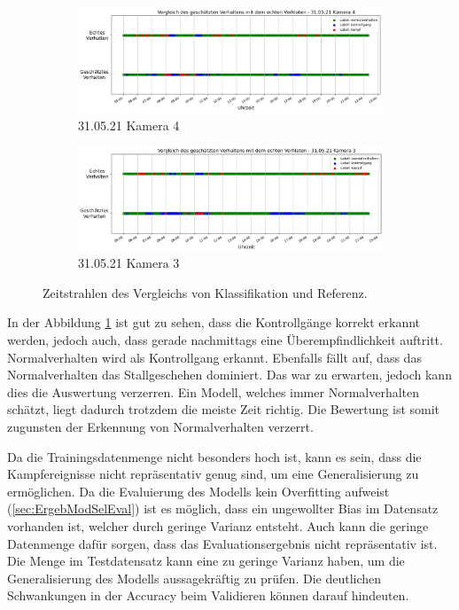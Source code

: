 \begin{figure}
     \centering
     \begin{subfigure}[b]{0.9\textwidth}
         \centering
         \includegraphics[width=\textwidth]{img/Plots/Simulation/Zeitstrahl Vergleich 31.05.21 cam 4.png}
         \caption{31.05.21 Kamera 4}
     \end{subfigure}
     \hfill
     \begin{subfigure}[b]{0.9\textwidth}
         \centering
         \includegraphics[width=\textwidth]{img/Plots/Simulation/Zeitstrahl Vergleich 31.05.21 cam 3.png}
         \caption{31.05.21 Kamera 3}
     \end{subfigure}
     \caption{Zeitstrahlen des Vergleichs von Klassifikation und Referenz.}
     \label{fig:zeitStrahlen}
\end{figure}


In der Abbildung \ref{fig:zeitStrahlen} ist gut zu sehen, dass die Kontrollgänge korrekt erkannt werden, jedoch auch, dass gerade nachmittags eine Überempfindlichkeit auftritt. Normalverhalten wird als Kontrollgang erkannt. Ebenfalls fällt auf, dass das Normalverhalten das Stallgeschehen dominiert. Das war zu erwarten, jedoch kann dies die Auswertung verzerren. Ein Modell, welches immer Normalverhalten schätzt, liegt dadurch trotzdem die meiste Zeit richtig. Die Bewertung ist somit zugunsten der Erkennung von Normalverhalten verzerrt. \par

Da die Trainingsdatenmenge nicht besonders hoch ist, kann es sein, dass die Kampfereignisse nicht repräsentativ genug sind, um eine Generalisierung zu ermöglichen. Da die Evaluierung des Modells kein Overfitting aufweist (\autoref{sec:ErgebModSelEval}) ist es möglich, dass ein ungewollter Bias im Datensatz vorhanden ist, welcher durch geringe Varianz entsteht. Auch kann die geringe Datenmenge dafür sorgen, dass das Evaluationsergebnis nicht repräsentativ ist. Die Menge im Testdatensatz kann eine zu geringe Varianz haben, um die Generalisierung des Modells aussagekräftig zu prüfen. Die deutlichen Schwankungen in der Accuracy beim Validieren können darauf hindeuten.\par

